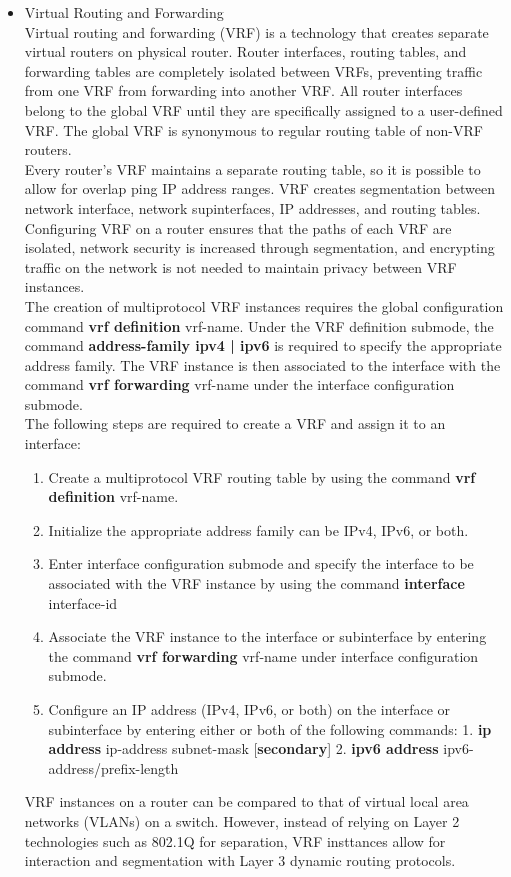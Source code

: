 \documentclass{article}
\begin{document}
\begin{itemize}
\item Virtual Routing and Forwarding\\

	Virtual routing and forwarding (VRF) is a technology that creates separate virtual routers on physical router. Router interfaces, routing tables, and forwarding tables are completely isolated between VRFs, preventing traffic from one VRF from forwarding into another VRF. All router interfaces belong to the global VRF until they are specifically assigned to a user-defined VRF. The global VRF is synonymous to regular routing table of non-VRF routers.\\

	Every router's VRF maintains a separate routing table, so it is possible to allow for overlap ping IP address ranges. VRF creates segmentation between network interface, network supinterfaces, IP addresses, and routing tables. Configuring VRF on a router ensures that the paths of each VRF are isolated, network security is increased through segmentation, and encrypting traffic on the network is not needed to maintain privacy between VRF instances.\\

	The creation of multiprotocol VRF instances requires the global configuration command \textbf{vrf definition} vrf-name. Under the VRF definition submode, the command \textbf{address-family {ipv4 | ipv6}} is required to specify the appropriate address family. The VRF instance is then associated to the interface with the command \textbf{vrf forwarding} vrf-name under the interface configuration submode.\\

	The following steps are required to create a VRF and assign it to an interface:
	\begin{enumerate}
		\item Create a multiprotocol VRF routing table by using the command \textbf{vrf definition} vrf-name.
		\item Initialize the appropriate address family can be IPv4, IPv6, or both.
		\item Enter interface configuration submode and specify the interface to be associated with the VRF instance by using the command \textbf{interface} interface-id
		\item Associate the VRF instance to the interface or subinterface by entering the command \textbf{vrf forwarding} vrf-name under interface configuration submode.
		\item Configure an IP address (IPv4, IPv6, or both) on the interface or subinterface by entering either or both of the following commands: 1. \textbf{ip address} ip-address subnet-mask [\textbf{secondary}] 2. \textbf{ipv6 address} ipv6-address/prefix-length
	\end{enumerate}

	VRF instances on a router can be compared to that of virtual local area networks (VLANs) on a switch. However, instead of relying on Layer 2 technologies such as 802.1Q for separation, VRF insttances allow for interaction and segmentation with Layer 3 dynamic routing protocols.
\end{itemize}
\end{document}
